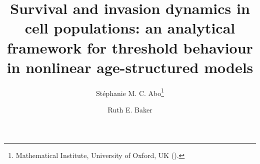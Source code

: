 \usepackage{amsmath,amssymb,amsfonts}
\usepackage{graphicx}
\usepackage{epstopdf}



\usepackage{bm}          %
\usepackage{mathrsfs}    %
\usepackage{mathtools}   %
\usepackage{physics}
\usepackage{xcolor}
\usepackage{enumitem}
\usepackage{booktabs}
\usepackage{threeparttable}
\usepackage{algorithm} 
\usepackage{algpseudocode}  

\ifpdf
\else
\fi

\newcommand{\creflastconjunction}{, and~}

%


\title{Survival and invasion dynamics in cell populations: an analytical framework for threshold behaviour in nonlinear age-structured models}

\author{St\'ephanie M. C. Abo\thanks{Mathematical Institute, University of Oxford, UK 
  ().}
\and Ruth E. Baker\footnotemark[1]}

\newcommand{\D}{\mathrm{d}}
\newcommand{\R}{\mathbb{R}}
\newcommand{\Pc}{P_c}  %
\newcommand{\U}{\mathcal{U}} %
\newcommand{\FKPP}{Fisher--KPP}

\usepackage{amsopn}
\DeclareMathOperator{\diag}{diag}


\newcommand{\stephanie}[1]{{\color{stephaniecolor} #1}}


